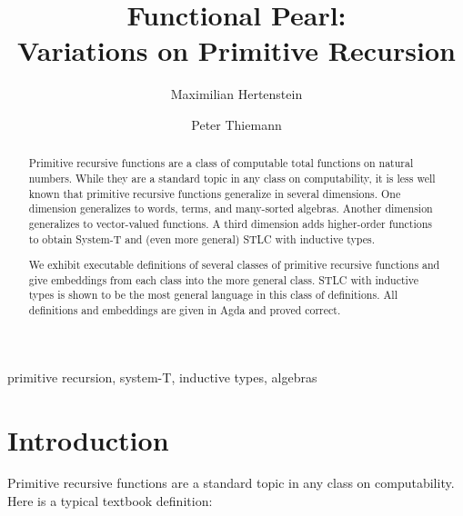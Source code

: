 \documentclass{jfp}
\begin{document}


\totalpg{\pageref{lastpage01}}

\title{Functional Pearl:\\ Variations on Primitive Recursion}

\begin{authgrp}
  \author{Maximilian Hertenstein}
  \author{Peter Thiemann}
\end{authgrp}


\begin{abstract}
Primitive recursive functions are a class of computable total
functions on natural numbers. While they are a standard topic in any
class on computability, it is less well known that primitive recursive
functions generalize in several dimensions. One dimension generalizes
to words, terms, and many-sorted algebras. Another dimension
generalizes to vector-valued functions. A third dimension adds
higher-order functions to obtain System-T and (even more general) STLC
with inductive types. 

We exhibit executable definitions of several classes of primitive
recursive functions and give embeddings from each class into the more
general class. STLC with inductive types is shown to be the most
general language in this class of definitions. All definitions and
embeddings are given in Agda and proved correct.
\end{abstract}
\begin{keywords}
primitive recursion, system-T, inductive types, algebras
\end{keywords}

\maketitle[F]

\section{Introduction}
\label{sec:introduction}

Primitive recursive functions are a standard topic in any class on
computability. 
Here is a typical textbook definition:
\end{document}
